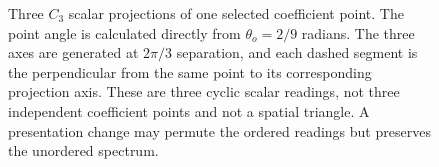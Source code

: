 \begin{figure}[t]
\caption{Three \(C_3\) scalar projections of one selected coefficient point.
The point angle is calculated directly from \(\theta_o=2/9\) radians.  The
three axes are generated at \(2\pi/3\) separation, and each dashed segment is
the perpendicular from the same point to its corresponding projection axis.
These are three cyclic scalar readings, not three independent coefficient
points and not a spatial triangle.  A presentation change may permute the
ordered readings but preserves the unordered spectrum.}
\label{fig:c3-spectral-projections}
\end{figure}
